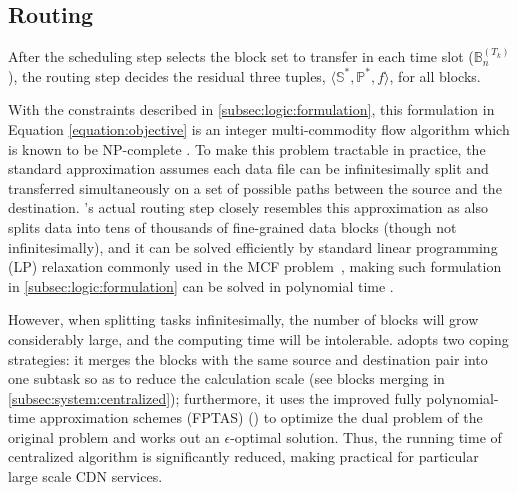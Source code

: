 \subsection{Routing}
\label{subsec:logic:routing}

After the scheduling step selects the block set to transfer in each time slot ($\mathbb{B}^{(T_k)}_n$), the routing step decides the residual three tuples, $\langle \mathbb{S}^*, \mathbb{P}^*, f \rangle$, for all blocks.

With the constraints described in \Section\ref{subsec:logic:formulation}, this formulation in Equation \ref{equation:objective} is an integer multi-commodity flow algorithm which is known to be NP-complete \cite{garg1997primal}.
To make this problem tractable in practice,
the standard approximation assumes each data file can be infinitesimally split and transferred simultaneously on a set of possible paths between the source and the destination.
\name's actual routing step closely resembles this approximation as \name also splits data into tens of thousands of fine-grained data blocks (though not infinitesimally), and it can be solved efficiently by standard linear programming (LP) relaxation commonly used in the MCF problem~\cite{garg2007faster},
making such formulation in \Section\ref{subsec:logic:formulation} can be solved in polynomial time \cite{reed2012traffic}.

However, when splitting tasks infinitesimally, the number of blocks will grow considerably large, and the computing time will be intolerable. \name adopts two coping strategies: it merges the blocks with the same source and destination pair into one subtask so as to reduce the calculation scale (see blocks merging in \Section\ref{subsec:system:centralized}); furthermore, it uses the improved fully polynomial-time approximation schemes (FPTAS) (\cite{fleischer2000approximating}) to optimize the dual problem of the original problem and works out an $\epsilon$-optimal solution. Thus, the running time of centralized algorithm is significantly reduced, making \name practical for particular large scale CDN services.
